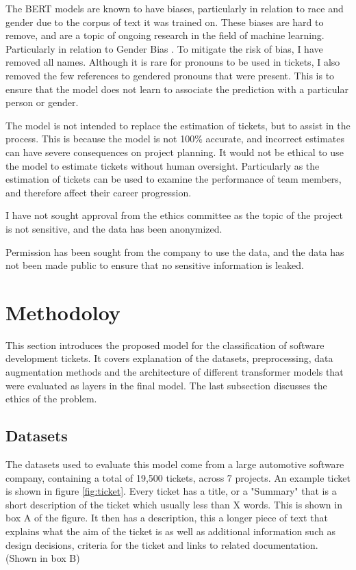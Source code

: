 \documentclass{UoYCSproject}
\begin{document}
    The BERT models are known to have biases, particularly in relation to race and gender due to the corpus of text it was trained on.
    These biases are hard to remove, and are a topic of ongoing research in the field of machine learning. Particularly in relation to Gender Bias \cite{Jentzsch_2022, li2021detecting}.
    To mitigate the risk of bias, I have removed all names. Although it is rare for pronouns to be used in tickets, I also removed the few references to gendered pronouns that were present.
    This is to ensure that the model does not learn to associate the prediction with a particular person or gender.

    The model is not intended to replace the estimation of tickets, but to assist in the process. This is because the model is not 100\% accurate, and incorrect estimates can have severe consequences on project planning.
    It would not be ethical to use the model to estimate tickets without human oversight. Particularly as the estimation of tickets can be used to examine the performance of team members, and therefore affect their career progression.

    I have not sought approval from the ethics committee as the topic of the project is not sensitive, and the data has been anonymized.

    Permission has been sought from the company to use the data, and the data has not been made public to ensure that no sensitive information is leaked.


    \chapter{Methodoloy}
    \label{ch:methodology}
    This section introduces the proposed model for the classification of software development tickets.
    It covers explanation of the datasets, preprocessing, data augmentation methods and the architecture of different transformer models that were evaluated as layers in the final model.
    The last subsection discusses the ethics of the problem.


    \section{Datasets}\label{sec:datasets}
    The datasets used to evaluate this model come from a large automotive software company, containing a total of 19,500 tickets, across 7 projects.
    An example ticket is shown in figure \ref{fig:ticket}.
    Every ticket has a title, or a "Summary" that is a short description of the ticket which usually less than X words. This is shown in box A of the figure.
    It then has a description, this a longer piece of text that explains what the aim of the ticket is as well as additional information such as design decisions, criteria for the ticket and links to related documentation. (Shown in box B) \par
\end{document}
